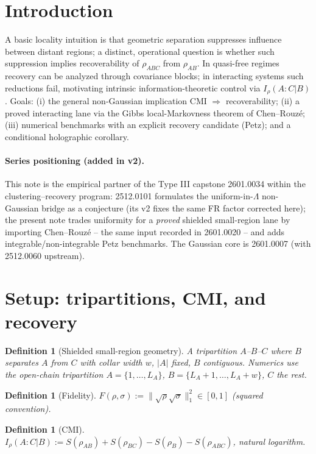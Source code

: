 \documentclass[11pt]{article}
\newtheorem{definition}[theorem]{Definition}
\theoremstyle{remark}
\begin{document}
\section{Introduction}
A basic locality intuition is that geometric separation suppresses
influence between distant regions; a distinct, operational question is
whether such suppression implies recoverability of $\rho_{ABC}$ from
$\rho_{AB}$. In quasi-free regimes recovery can be analyzed through
covariance blocks; in interacting systems such reductions fail, motivating
intrinsic information-theoretic control via $I_\rho(A:C|B)$. Goals:
(i) the general non-Gaussian implication CMI $\Rightarrow$ recoverability;
(ii) a proved interacting lane via the Gibbs local-Markovness theorem of
Chen--Rouz\'e; (iii) numerical benchmarks with an explicit recovery
candidate (Petz); and a conditional holographic corollary.

\paragraph{Series positioning (added in v2).} This note is the empirical
partner of the Type III capstone 2601.0034 \cite{S0034} within the
clustering--recovery program: 2512.0101 \cite{S0101} formulates the
uniform-in-$\Lambda$ non-Gaussian bridge as a conjecture (its v2 fixes the
same FR factor corrected here); the present note trades uniformity for a
\emph{proved} shielded small-region lane by importing Chen--Rouz\'e
\cite{CR} -- the same input recorded in 2601.0020 \cite{S0020} -- and
adds integrable/non-integrable Petz benchmarks. The Gaussian core is
2601.0007 \cite{S0007} (with 2512.0060 \cite{S0060} upstream).

\section{Setup: tripartitions, CMI, and recovery}
\begin{definition}[Shielded small-region geometry]
A tripartition $A$--$B$--$C$ where $B$ separates $A$ from $C$ with collar
width $w$, $|A|$ fixed, $B$ contiguous. Numerics use the open-chain
tripartition $A = \{1,\dots,L_A\}$, $B = \{L_A{+}1,\dots,L_A{+}w\}$,
$C$ the rest.
\end{definition}
\begin{definition}[Fidelity]
$F(\rho,\sigma) := \|\sqrt\rho\sqrt\sigma\|_1^2 \in [0,1]$ (squared
convention).
\end{definition}
\begin{definition}[CMI]
$I_\rho(A:C|B) := S(\rho_{AB}) + S(\rho_{BC}) - S(\rho_B) -
S(\rho_{ABC})$, natural logarithm.
\end{definition}
\end{document}
